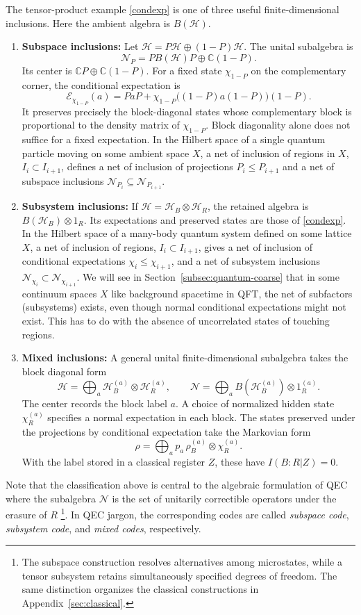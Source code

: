 \documentclass[a4paper,11pt]{article}
\theoremstyle{definition}
\newcommand{\mN}{\mathcal{N}}
\newcommand{\mE}{\mathcal{E}}
\begin{document}
The tensor-product example \eqref{condexp} is one of three useful finite-dimensional
inclusions. Here the ambient algebra is $B(\mathcal H)$.
\begin{enumerate}
 \item {\bf Subspace inclusions:} Let $\mathcal H=P\mathcal H\oplus(1-P)\mathcal H$.
 The unital subalgebra is
 \[
  \mN_P=P B(\mathcal H)P\oplus\mathbb C(1-P).
 \]
 Its center is $\mathbb CP\oplus\mathbb C(1-P)$. For a fixed state $\chi_{1-P}$
 on the complementary corner, the conditional expectation is
 \[
  \mE_{\chi_{1-P}}(a)=PaP+
  \chi_{1-P}\bigl((1-P)a(1-P)\bigr)(1-P).
 \]
 It preserves precisely the block-diagonal states whose complementary block
 is proportional to the density matrix of $\chi_{1-P}$.
 Block diagonality alone does not suffice for a fixed expectation.
In the Hilbert space of a single quantum particle moving on some ambient space $X$, a net of inclusion of regions in $X$, $I_i\subset I_{i+1}$, defines a net of inclusion of projections $P_i\leq P_{i+1}$ and a net of subspace inclusions $\mN_{P_i}\subseteq\mN_{P_{i+1}}$. 
 
 \item {\bf Subsystem inclusions:} If $\mathcal H=\mathcal H_B\otimes\mathcal H_R$,
 the retained algebra is $B(\mathcal H_B)\otimes1_R$.
 Its expectations and preserved states are those of \eqref{condexp}. In the Hilbert space of a many-body quantum system defined on some lattice $X$, a net of inclusion of regions, $I_i\subset I_{i+1}$, gives a net of inclusion of conditional expectations $\chi_i \leq\chi_{i+1}$, and a net of subsystem inclusions $\mN_{\chi_i}\subset \mN_{\chi_{i+1}}$. We will see in Section~\ref{subsec:quantum-coarse} that in some continuum spaces $X$ like background spacetime in QFT, the net of subfactors (subsystems) exists, even though normal conditional expectations might not exist. This has to do with the absence of uncorrelated states of touching regions.
 
 \item {\bf Mixed inclusions:} A general unital finite-dimensional subalgebra takes the block diagonal form
 \[
  \mathcal H=\bigoplus_a\mathcal H_B^{(a)}\otimes\mathcal H_R^{(a)},\qquad
  \mN=\bigoplus_a B(\mathcal H_B^{(a)})\otimes1_R^{(a)}.
 \]
 The center records the block label $a$. A choice of normalized hidden state $\chi_R^{(a)}$ specifies a normal
 expectation in each block. The states preserved under the projections by conditional expectation take the Markovian form
 \[
  \rho=\bigoplus_a p_a\,\rho_B^{(a)}\otimes\chi_R^{(a)}.
 \]
 With the label stored in a classical register $Z$, these have $I(B:R|Z)=0$.
\end{enumerate}
Note that the classification above is central to the algebraic formulation of QEC where the subalgebra $\mN$ is the set of unitarily correctible operators under the erasure of $R$ \cite{KribsLaflammePoulin2005,BenyKempfKribs2007} \footnote{The subspace construction resolves alternatives among microstates, while a tensor
subsystem retains simultaneously specified degrees of freedom. The same distinction
organizes the classical constructions in Appendix~\ref{sec:classical}.
}. In QEC jargon, the corresponding codes are called {\it subspace code}, {\it subsystem code}, and {\it mixed codes}, respectively.
\end{document}
